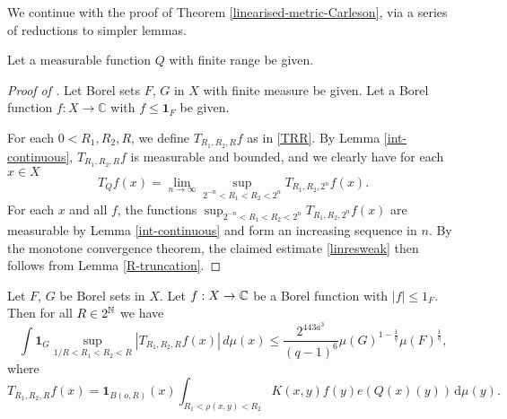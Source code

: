 We continue with the proof of Theorem \ref{linearised-metric-Carleson}, via a series of reductions to simpler lemmas.

Let a measurable function $Q$ with finite range be given.

\begin{proof}[Proof of ]
\leanok
{}
Let Borel sets $F$, $G$ in $X$ with finite measure be given. Let a Borel function $f: X \to \mathbb{C}$ with $f \le \mathbf{1}_F$ be given.

For each $0 < R_1,R_2,R$, we define $T_{R_1,R_2,R}f$ as in \eqref{TRR}.
By Lemma \ref{int-continuous},
$T_{R_1,R_2,R}f$
is measurable and bounded, and we clearly have for each $x \in X$
\[
    T_Q f(x) = \lim_{n \to \infty} \sup_{2^{-n} < R_1 < R_2 < 2^n} T_{R_1, R_2, 2^n}f(x).
\]
For each $x$ and all $f$, the functions $\sup_{2^{-n} < R_1 < R_2 < 2^n} T_{R_1, R_2, 2^n} f(x)$ are measurable by Lemma \ref{int-continuous} and form an increasing sequence in $n$. By the monotone convergence theorem, the claimed estimate \eqref{linresweak} then follows from Lemma \ref{R-truncation}.
\end{proof}

\begin{lemma}[R truncation]
    \label{R-truncation}
    \leanok

    Let $F$, $G$ be Borel sets in $X$. Let $f:X\to \mathbb{C}$ be a Borel function with $|f|\le 1_F$. Then for all $R\in 2^{\mathbb{N}}$ we have
    \begin{equation} \label{Rcut}
        \int \mathbf{1}_G \sup_{1/R<R_1<R_2<R} |T_{R_1,R_2,R} f(x)|\, d\mu(x) \le \frac{2^{443a^3}}{(q-1)^6} \mu(G)^{1-\frac{1}{q}} \mu(F)^{\frac{1}{q}},
    \end{equation}
    where
    \begin{equation}\label{TRR}
        T_{R_1,R_2,R} f(x)= \mathbf{1}_{B(o,R)}(x)
        \int_{R_1 < \rho(x,y) < R_2} K(x,y) f(y) e(Q(x)(y)) \, \mathrm{d}\mu(y) .
    \end{equation}
\end{lemma}

